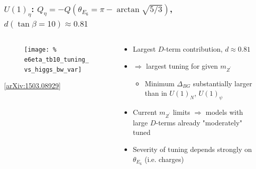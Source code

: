 \documentclass[10pt,aspectratio=169]{beamer}
\begin{document}
\begin{frame}
  \frametitle{$U(1)_\eta$: $Q_\eta = -Q(\theta_{E_6} = \pi
    - \arctan\sqrt{5/3})$, $d(\tan\beta = 10) \approx 0.81$}
  \begin{columns}
    \begin{column}{0.5\textwidth}
      \vspace*{-15pt}
      \begin{figure}
        \texttt{[image: \%
          e6eta\_tb10\_tuning\_vs\_higgs\_bw\_var]}
      \end{figure}
      \begin{center}
        \tiny [\href{https://arxiv.org/abs/1503.08929}{arXiv:1503.08929}]
      \end{center}
    \end{column}
    \begin{column}{0.5\textwidth}
      \begin{itemize} \itemsep1.5em
        \item Largest $D$-term contribution, $d \approx 0.81$
        \item \alert{$\Rightarrow$ largest tuning for given $m_{Z^\prime}$}
          \begin{itemize}
            \item Minimum $\Delta_{BG}$ substantially larger than in $U(1)_N$,
              $U(1)_\psi$
          \end{itemize}
        \item Current $m_{Z^\prime}$ limits $\Rightarrow$ models with large
            $D$-terms already "moderately" tuned
        \item Severity of tuning depends strongly on $\theta_{E_6}$
          (i.e. charges)
      \end{itemize}
    \end{column}
  \end{columns}
\end{frame}
\end{document}
